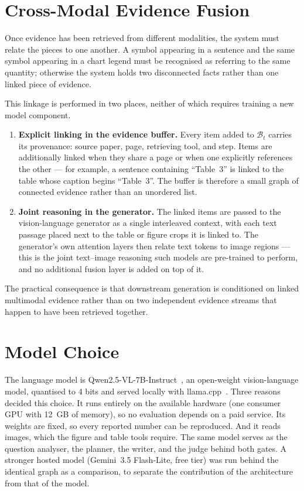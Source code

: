 \section{Cross-Modal Evidence Fusion}

Once evidence has been retrieved from different modalities, the system must relate
the pieces to one another. A symbol appearing in a sentence and the same symbol
appearing in a chart legend must be recognised as referring to the same quantity;
otherwise the system holds two disconnected facts rather than one linked piece of
evidence.

This linkage is performed in two places, neither of which requires training a new
model component.

\begin{enumerate}
    \item \textbf{Explicit linking in the evidence buffer.} Every item added to
    $\mathcal{B}_t$ carries its provenance: source paper, page, retrieving tool,
    and step. Items are additionally linked when they share a page or when one
    explicitly references the other --- for example, a sentence containing
    ``Table~3'' is linked to the table whose caption begins ``Table~3''. The buffer
    is therefore a small graph of connected evidence rather than an unordered list.

    \item \textbf{Joint reasoning in the generator.} The linked items are passed to
    the vision-language generator as a single interleaved context, with each text
    passage placed next to the table or figure crops it is linked to. The
    generator's own attention layers then relate text tokens to image regions ---
    this is the joint text--image reasoning such models are pre-trained to perform,
    and no additional fusion layer is added on top of it.
\end{enumerate}

The practical consequence is that downstream generation is conditioned on linked
multimodal evidence rather than on two independent evidence streams that happen to
have been retrieved together.

\section{Model Choice}

The language model is Qwen2.5-VL-7B-Instruct~\cite{bai2025qwen25vl}, an open-weight
vision-language model, quantised to 4 bits and served locally with
llama.cpp~\cite{llamacpp}. Three reasons decided this choice. It runs entirely on the
available hardware (one consumer GPU with 12~GB of memory), so no evaluation depends
on a paid service. Its weights are fixed, so every reported number can be
reproduced. And it reads images, which the figure and table tools require. The same
model serves as the question analyser, the planner, the writer, and the judge
behind both gates. A stronger hosted model (Gemini~3.5 Flash-Lite, free tier) was
run behind the identical graph as a comparison, to separate the contribution of the
architecture from that of the model.

